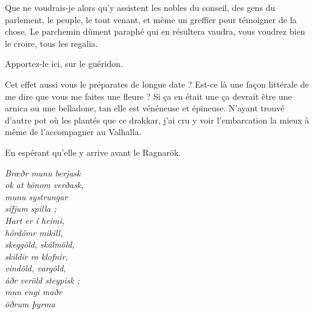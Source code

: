 \begin{drama}
  Que ne voudrais-je alors qu’y assistent les nobles du conseil, des gens du parlement, le peuple, le tout venant, et même un greffier pour témoigner de la chose. Le parchemin dûment paraphé qui en résultera vaudra, vous voudrez bien le croire, tous les regalia.

  \elenaspeaks {} Apportez-le ici, sur le guéridon.


  \reinespeaks Cet effet aussi vous le préparates de longue date ? Est-ce là une façon littérale de me dire que vous me faites une fleure ?
  \elenaspeaks Si ça en était une ça devrait être une arnica ou une belladone, tan elle est  vénéneuse et épineuse. N’ayant trouvé d’autre pot où les plantés que ce drakkar, j’ai cru y voir l’embarcation la mieux à même de l’accompagner au Valhalla.


  En espérant qu’elle y arrive avant le Ragnarök.



  \choirspeaks
  \begin{minipage}[t]{\linewidth}
    \em
    Brœðr munu berjask\endnote{\ragnarokendnote}\\
    ok at bönom verðask,\\
    munu systrungar\\
    sifjum spilla ;\\
    Hart er í heimi,\\
    hórdómr mikill,\\
    skeggöld, skálmöld,\\
    skildir ro klofnir,\\
    vindöld, vargöld,\\
    áðr veröld steypisk ;\\
    mun engi maðr\\
    öðrum þyrma
  \end{minipage}
\end{drama}

\scene

\StageDirII{\elena, \ela}


